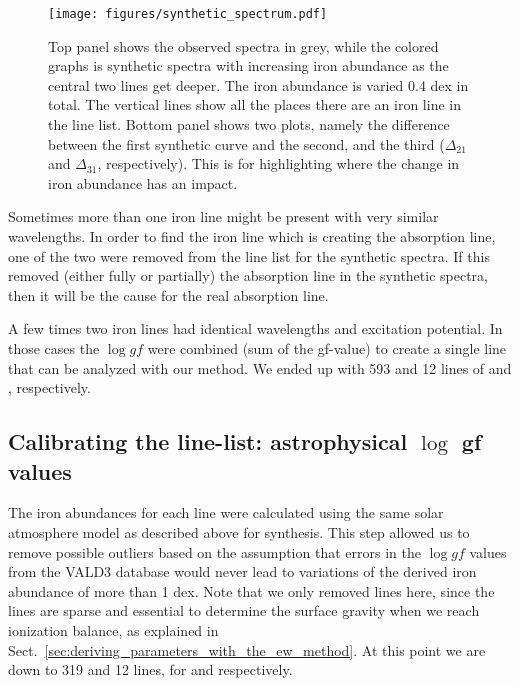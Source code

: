 \documentclass{aa}
\begin{document}
\begin{figure}[tpb]
    \centering
    \texttt{[image: figures/synthetic\_spectrum.pdf]}
    \caption{Top panel shows the observed spectra in grey, while
        the colored graphs is synthetic spectra with increasing iron
        abundance as the central two lines get deeper. The iron abundance
        is varied 0.4 dex in total. The vertical lines show all the places
        there are an iron line in the line list. Bottom panel shows
        two plots, namely the difference between the first synthetic curve
        and the second, and the third ($\Delta_{21}$ and $\Delta_{31}$,
        respectively). This is for highlighting where the change in iron
        abundance has an impact.}
    \label{fig:synthesis}
\end{figure}


Sometimes more than one iron line might be present with very similar
wavelengths. In order to find the iron line which is creating the
absorption line, one of the two were removed from the line list for
the synthetic spectra. If this removed (either fully or partially) the
absorption line in the synthetic spectra, then it will be the cause for
the real absorption line.

A few times two iron lines had identical wavelengths and excitation
potential. In those cases the $\log \mathit{gf}$ were combined (sum
of the gf-value) to create a single line that can be analyzed with
our method. We ended up with 593 and 12 lines of  and
, respectively.


\subsection{Calibrating the line-list: astrophysical $\log$ gf values}
\label{ssub:Recalibrating-the-atomic-data}

The iron abundances for each line were calculated using the
same solar atmosphere model as described above for synthesis. This
step allowed us to remove possible outliers based on the assumption
that errors in the $\log \mathit{gf}$ values from the VALD3 database
would never lead to variations of the derived iron abundance of more
than 1 dex. Note that we only removed  lines here, since
the  lines are sparse and essential to determine the
surface gravity when we reach ionization balance, as explained in
Sect.~\ref{sec:deriving_parameters_with_the_ew_method}. At this point
we are down to 319 and 12 lines, for  and 
respectively.
\end{document}
